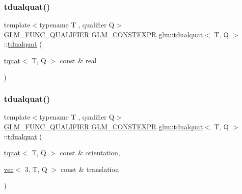 \subsubsection{\texorpdfstring{tdualquat()}{tdualquat()}\hspace{0.1cm}{\footnotesize\ttfamily [4/11]}}
{\footnotesize\ttfamily template$<$typename T , qualifier Q$>$ \\
\hyperlink{setup_8hpp_a33fdea6f91c5f834105f7415e2a64407}{G\+L\+M\+\_\+\+F\+U\+N\+C\+\_\+\+Q\+U\+A\+L\+I\+F\+I\+ER} \hyperlink{setup_8hpp_a08b807947b47031d3a511f03f89645ad}{G\+L\+M\+\_\+\+C\+O\+N\+S\+T\+E\+X\+PR} \hyperlink{structglm_1_1tdualquat}{glm\+::tdualquat}$<$ T, Q $>$\+::\hyperlink{structglm_1_1tdualquat}{tdualquat} (\begin{DoxyParamCaption}\item[{\hyperlink{structglm_1_1tquat}{tquat}$<$ T, Q $>$ const \&}]{real }\end{DoxyParamCaption})}

\mbox{\label{structglm_1_1tdualquat_aedfbe6fe7039943ccbf7d178731fa9b7}} 
\subsubsection{\texorpdfstring{tdualquat()}{tdualquat()}\hspace{0.1cm}{\footnotesize\ttfamily [5/11]}}
{\footnotesize\ttfamily template$<$typename T , qualifier Q$>$ \\
\hyperlink{setup_8hpp_a33fdea6f91c5f834105f7415e2a64407}{G\+L\+M\+\_\+\+F\+U\+N\+C\+\_\+\+Q\+U\+A\+L\+I\+F\+I\+ER} \hyperlink{setup_8hpp_a08b807947b47031d3a511f03f89645ad}{G\+L\+M\+\_\+\+C\+O\+N\+S\+T\+E\+X\+PR} \hyperlink{structglm_1_1tdualquat}{glm\+::tdualquat}$<$ T, Q $>$\+::\hyperlink{structglm_1_1tdualquat}{tdualquat} (\begin{DoxyParamCaption}\item[{\hyperlink{structglm_1_1tquat}{tquat}$<$ T, Q $>$ const \&}]{orientation,  }\item[{\hyperlink{structglm_1_1vec}{vec}$<$ 3, T, Q $>$ const \&}]{translation }\end{DoxyParamCaption})}

\mbox{\label{structglm_1_1tdualquat_ab86d3cf3f902945d1d774505b32f9f56}} 
